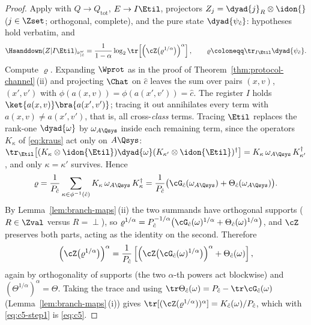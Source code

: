 \begin{proof}
Apply  with $Q\to Q_{\mathrm{tot}}$,
$E\to I\Etil$, projectors $Z_j=\dyad{j}_R\otimes\idon{}$
($j\in\Zset$; orthogonal, complete), and the pure state
$\dyad{\psi_{\hat c}}$: hypotheses hold verbatim, and
\begin{equation}\label{eq:c5-step1}
  \Hsanddown(Z|I\Etil)_{\nu^{\omega}_{|\hat c}}
  =\frac{1}{1-\alpha}\log_2
  \tr\!\left[\left(\cZ\big(\varrho^{1/\alpha}\big)\right)^{\alpha}\right],
  \qquad
  \varrho\coloneqq\tr_{I\Etil}\dyad{\psi_{\hat c}}.
\end{equation}
Compute $\varrho$. Expanding $\Wprot$ as in the proof of
Theorem~\ref{thm:protocol-channel}\,(ii) and projecting $\Chat$ on $\hat c$ leaves the sum
over pairs $(x,v)$, $(x',v')$ with
$\phi(a(x,v))=\phi(a(x',v'))=\hat c$. The register $I$ holds
$\ket{a(x,v)}\bra{a(x',v')}$; tracing it out annihilates every term with
$a(x,v)\ne a(x',v')$, that is, all cross-\emph{class} terms. Tracing $\Etil$
replaces the rank-one $\dyad{\omega}$ by $\omega_{A\Qsys}$ inside each
remaining term, since the operators $K_{\kappa}$ of \eqref{eq:kraus} act
only on $A\Qsys$:
$\tr_{\Etil}\big[(K_{\kappa}\otimes\idon{\Etil})\dyad{\omega}
(K_{\kappa'}\otimes\idon{\Etil})^{\dagger}\big]
=K_{\kappa}\,\omega_{A\Qsys}\,K_{\kappa'}^{\dagger}$, and only
$\kappa=\kappa'$ survives. Hence
\begin{equation}\label{eq:varrho}
  \varrho=\frac{1}{P_{\hat c}}
  \sum_{\kappa\in\phi^{-1}(\hat c)}K_{\kappa}\,\omega_{A\Qsys}\,
  K_{\kappa}^{\dagger}
  =\frac{1}{P_{\hat c}}\big(\cG_{\hat c}(\omega_{A\Qsys})
  +\Theta_{\hat c}(\omega_{A\Qsys})\big).
\end{equation}
By Lemma~\ref{lem:branch-maps}\,(ii) the two summands have orthogonal supports
($R\in\Zval$ versus $R=\perp$), so
$\varrho^{1/\alpha}=P_{\hat c}^{-1/\alpha}
\big(\cG_{\hat c}(\omega)^{1/\alpha}+\Theta_{\hat c}(\omega)^{1/\alpha}\big)$,
and $\cZ$ preserves both parts, acting as the identity on the second.
Therefore
\begin{equation*}
  \left(\cZ\big(\varrho^{1/\alpha}\big)\right)^{\alpha}
  =\frac{1}{P_{\hat c}}\left[
  \left(\cZ\big(\cG_{\hat c}(\omega)^{1/\alpha}\big)\right)^{\alpha}
  +\Theta_{\hat c}(\omega)\right],
\end{equation*}
again by orthogonality of supports (the two $\alpha$-th powers act
blockwise) and
$(\Theta^{1/\alpha})^{\alpha}=\Theta$. Taking the trace and using
$\tr\Theta_{\hat c}(\omega)=P_{\hat c}-\tr\cG_{\hat c}(\omega)$
(Lemma~\ref{lem:branch-maps}\,(i)) gives
$\tr[(\cZ(\varrho^{1/\alpha}))^{\alpha}]
=K_{\hat c}(\omega)/P_{\hat c}$, which with \eqref{eq:c5-step1} is
\eqref{eq:c5}.


\end{proof}
